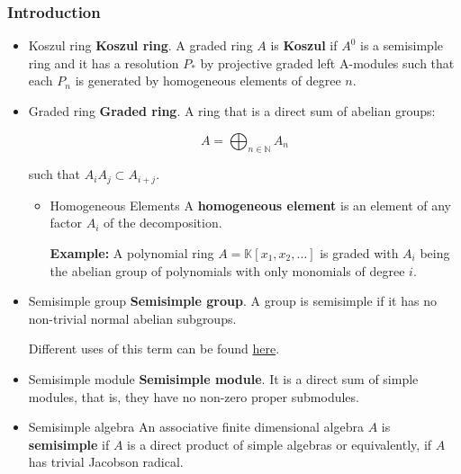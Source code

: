 \documentclass[11pt]{article}
\begin{document}
\subsubsection*{Introduction}
\label{sec-1-5-1}
\begin{itemize}
\item Koszul ring
\label{sec-1-5-1-1}
\textbf{Koszul ring}. A graded ring $A$ is \textbf{Koszul} if $A^0$ is a semisimple ring 
and it has a resolution $P_\ast$ by projective graded left A-modules such 
that each $P_n$ is generated by homogeneous elements of degree $n$.

\item Graded ring
\label{sec-1-5-1-2}
\textbf{Graded ring}. A ring that is a direct sum of abelian groups:

\[ A = \bigoplus_{n \in \mathbb{N}} A_n\]

such that $A_iA_j \subset A_{i+j}$.

\begin{itemize}
\item Homogeneous Elements
\label{sec-1-5-1-2-1}
A \textbf{homogeneous element} is an element of any factor $A_i$ of the 
decomposition.

\textbf{Example:} A polynomial ring $A = \mathbb{K}[x_1,x_2, \dots]$ is graded with $A_i$ 
being the abelian group of polynomials with only monomials of 
degree $i$.
\end{itemize}

\item Semisimple group
\label{sec-1-5-1-3}
\textbf{Semisimple group}. A group is semisimple if it has no non-trivial 
normal abelian subgroups.

Different uses of this term can be found \href{http://planetmath.org/semisimplegroup}{here}.

\item Semisimple module
\label{sec-1-5-1-4}
\textbf{Semisimple module}. It is a direct sum of simple modules, that is, 
they have no non-zero proper submodules.

\item Semisimple algebra
\label{sec-1-5-1-5}
An associative finite dimensional algebra $A$ is \textbf{semisimple} if
$A$ is a direct product of simple algebras or equivalently, if $A$ has
trivial Jacobson radical.
\end{itemize}
\end{document}
